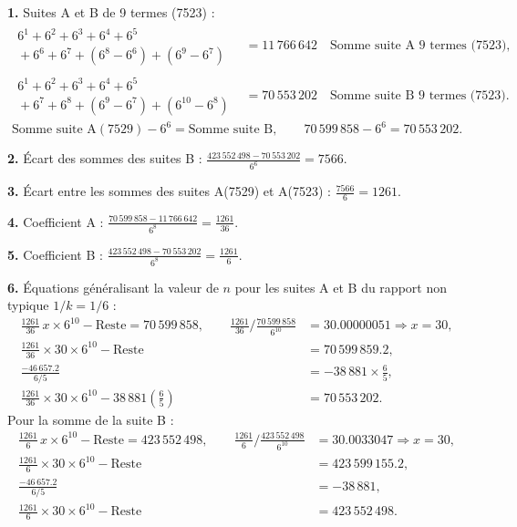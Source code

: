 \documentclass[11pt,a4paper]{article}
\begin{document}
\begin{boitenote}
\begin{boitenote}[Inspiration]
\begin{boitenote}
\textbf{1.} Suites A et B de 9 termes (7523) :
\begin{align*}
\begin{gathered}
6^{1}+6^{2}+6^{3}+6^{4}+6^{5}\\
{}+6^{6}+6^{7}+(6^{8}-6^{6})+(6^{9}-6^{7})
\end{gathered}
&=11\,766\,642\quad\text{Somme suite A 9 termes (7523)},\\
\begin{gathered}
6^{1}+6^{2}+6^{3}+6^{4}+6^{5}\\
{}+6^{7}+6^{8}+(6^{9}-6^{7})+(6^{10}-6^{8})
\end{gathered}
&=70\,553\,202\quad\text{Somme suite B 9 termes (7523)}.
\end{align*}
\[
\text{Somme suite A}(7529) - 6^{6} = \text{Somme suite B},
\qquad
70\,599\,858 - 6^{6} = 70\,553\,202.
\]

\textbf{2.} Écart des sommes des suites B :
$\displaystyle \frac{423\,552\,498 - 70\,553\,202}{6^{6}} = 7566$.

\textbf{3.} Écart entre les sommes des suites A(7529) et A(7523) :
$\displaystyle \frac{7566}{6} = 1261$.

\textbf{4.} Coefficient A :
$\displaystyle \frac{70\,599\,858 - 11\,766\,642}{6^{8}} = \frac{1261}{36}$.

\textbf{5.} Coefficient B :
$\displaystyle \frac{423\,552\,498 - 70\,553\,202}{6^{8}} = \frac{1261}{6}$.

\textbf{6.} Équations généralisant la valeur de $n$ pour les suites A et B du
rapport non typique $1/k = 1/6$ :
\begin{align*}
\frac{1261}{36}\, x \times 6^{10} - \text{Reste} = 70\,599\,858,
\qquad
\frac{1261}{36}\Big/\frac{70\,599\,858}{6^{10}}
&=30.00000051\Rightarrow x=30,\\
\frac{1261}{36}\times30\times6^{10}-\text{Reste}
&=70\,599\,859.2,\\
\frac{-46\,657.2}{6/5} &=-38\,881\times\frac{6}{5},\\
\frac{1261}{36}\times30\times6^{10}
-38\,881\left(\frac{6}{5}\right)
&=70\,553\,202.
\end{align*}
Pour la somme de la suite B :
\begin{align*}
\frac{1261}{6}\, x \times 6^{10} - \text{Reste} = 423\,552\,498,
\qquad
\frac{1261}{6}\Big/\frac{423\,552\,498}{6^{10}}
&=30.0033047\Rightarrow x=30,\\
\frac{1261}{6}\times30\times6^{10}-\text{Reste}
&=423\,599\,155.2,\\
\frac{-46\,657.2}{6/5} &=-38\,881,\\
\frac{1261}{6}\times30\times6^{10}-\text{Reste}
&=423\,552\,498.
\end{align*}


\end{boitenote}
\end{boitenote}
\end{boitenote}
\end{document}
